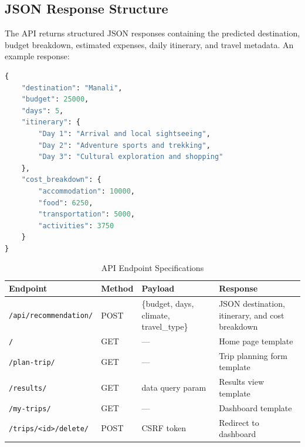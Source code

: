 \subsection{JSON Response Structure}

The API returns structured JSON responses containing the predicted destination, budget breakdown, estimated expenses, daily itinerary, and travel metadata. An example response:

\begin{lstlisting}[language=Python, caption={API JSON Response Example}, label={lst:api-response}]
{
    "destination": "Manali",
    "budget": 25000,
    "days": 5,
    "itinerary": {
        "Day 1": "Arrival and local sightseeing",
        "Day 2": "Adventure sports and trekking",
        "Day 3": "Cultural exploration and shopping"
    },
    "cost_breakdown": {
        "accommodation": 10000,
        "food": 6250,
        "transportation": 5000,
        "activities": 3750
    }
}
\end{lstlisting}

\begin{table}[H]
    \centering
    \caption{API Endpoint Specifications}
    \label{tab:api-endpoints}
    \begin{tabularx}{\textwidth}{@{} >{\raggedright\arraybackslash}p{5.2cm} l >{\raggedright\arraybackslash}p{3.5cm} >{\raggedright\arraybackslash}X @{}}
        \toprule
        \textbf{Endpoint} & \textbf{Method} & \textbf{Payload} & \textbf{Response} \\
        \midrule
        \texttt{/api/recommendation/} & POST & \{budget, \allowbreak days, \allowbreak climate, \allowbreak travel\_type\} & JSON destination, itinerary, and cost breakdown \\
        \texttt{/} & GET & --- & Home page template \\
        \texttt{/plan-trip/} & GET & --- & Trip planning form template \\
        \texttt{/results/} & GET & data query param & Results view template \\
        \texttt{/my-trips/} & GET & --- & Dashboard template \\
        \texttt{/trips/<id>/delete/} & POST & CSRF token & Redirect to dashboard \\
        \bottomrule
    \end{tabularx}
\end{table}
